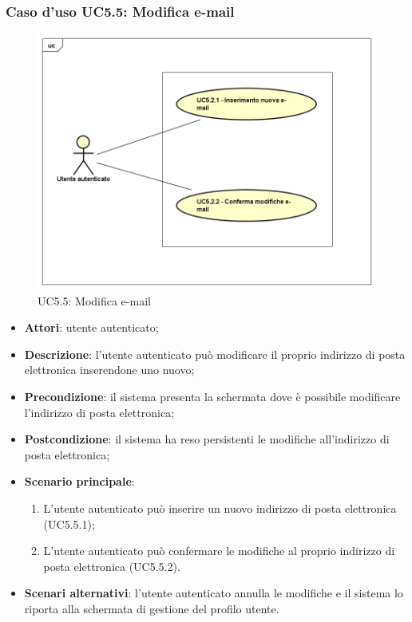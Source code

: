 \subsubsection{Caso d'uso UC5.5: Modifica e-mail}
\label{UC5.5}
\begin{figure}[h]
	\centering
	\includegraphics[scale=0.5,keepaspectratio]{UML/UC5_5.png}
	\caption{UC5.5: Modifica e-mail}
\end{figure}
\begin{itemize}
	\item \textbf{Attori}: utente autenticato;
	\item \textbf{Descrizione}: l'utente autenticato può modificare il proprio indirizzo di posta elettronica inserendone uno nuovo;
	\item \textbf{Precondizione}: il sistema presenta la schermata dove è possibile modificare l'indirizzo di posta elettronica;
	\item \textbf{Postcondizione}: il sistema ha reso persistenti le modifiche all'indirizzo di posta elettronica;
	\item \textbf{Scenario principale}:
		\begin{enumerate}
			\item L'utente autenticato può inserire un nuovo indirizzo di posta elettronica (UC5.5.1);
			\item L'utente autenticato può confermare le modifiche al proprio indirizzo di posta elettronica (UC5.5.2).
		\end{enumerate}
	\item \textbf{Scenari alternativi}: l'utente autenticato annulla le modifiche e il sistema lo riporta alla schermata di gestione del profilo utente.
\end{itemize}

